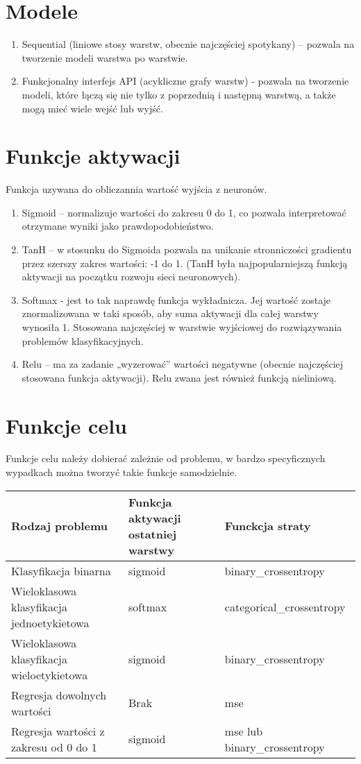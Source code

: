 \documentclass[12pt]{article}
\begin{document}
\section{Modele}
\begin{enumerate}
	\item Sequential (liniowe stosy warstw, obecnie najczęściej spotykany) – pozwala na tworzenie modeli warstwa po warstwie.
	\item Funkcjonalny interfejs API (acykliczne grafy warstw) - pozwala na tworzenie modeli, które łączą się nie tylko z poprzednią i następną warstwą, a także mogą mieć wiele wejść lub wyjść.
\end{enumerate}


\section{Funkcje aktywacji}
Funkcja uzywana do obliczannia wartość wyjścia z neuronów. 
\begin{enumerate}
	\item Sigmoid – normalizuje wartości do zakresu 0 do 1, co pozwala interpretować otrzymane wyniki jako prawdopodobieństwo.
	\item TanH – w stosunku do Sigmoida pozwala na unikanie stronniczości gradientu przez szerszy zakres wartości: -1 do 1. (TanH była najpopularniejszą funkcją aktywacji na początku rozwoju sieci neuronowych). 
	\item Softmax - jest to tak naprawdę funkcja wykładnicza. Jej wartość zostaje znormalizowana w taki sposób, aby suma aktywacji dla całej warstwy wynosiła 1. Stosowana najczęściej w warstwie wyjściowej do rozwiązywania problemów klasyfikacyjnych.
	\item Relu – ma za zadanie „wyzerować” wartości negatywne (obecnie najczęściej stosowana funkcja aktywacji). Relu zwana jest również funkcją nieliniową.
\end{enumerate}

\section{Funkcje celu}
Funkcje celu należy dobierać zależnie od problemu, w bardzo specyficznych wypadkach można tworzyć takie funkcje samodzielnie.
\begin{center}
	\begin{tabular}{ | L{6cm} | L{4cm} | L{5cm} |}
		\hline
		Rodzaj problemu & Funkcja aktywacji ostatniej warstwy & Funckcja straty \\ \hline
		Klasyfikacja binarna & sigmoid & binary\_crossentropy \\  \hline
		Wieloklasowa klasyfikacja jednoetykietowa & softmax & categorical\_crossentropy \\  \hline 
		Wieloklasowa klasyfikacja wieloetykietowa & sigmoid & binary\_crossentropy  \\ \hline
		Regresja dowolnych wartości & Brak & mse \\  \hline
		 Regresja wartości z zakresu od 0 do 1 & sigmoid & mse lub binary\_crossentropy\\ \hline
	\end{tabular}
\end{center}
\end{document}
